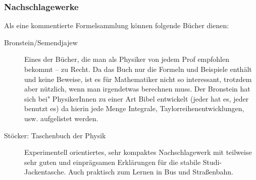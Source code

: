 \subsubsection*{Nachschlagewerke}

Als eine kommentierte Formelsammlung können folgende Bücher dienen:

\begin{description}

\item[Bronstein/Semendjajew]{
Eines der Bücher, die man als Physiker von jedem Prof empfohlen
bekommt -- zu
Recht. Da das Buch nur die Formeln und Beispiele enthält und keine
Beweise,
ist es für Mathematiker nicht so interessant, trotzdem aber nützlich,
wenn
man irgendetwas berechnen muss. Der Bronstein hat sich bei"
PhysikerInnen
zu einer Art Bibel entwickelt (jeder hat es, jeder benutzt es) da
hierin jede Menge Integrale,
Taylorreihenentwicklungen, usw. aufgelistet werden.}

\item[Stöcker: Taschenbuch der Physik]{
Experimentell orientiertes, sehr kompaktes Nachschlagewerk mit
teilweise sehr
guten und einprägsamen Erklärungen für die stabile Studi-
Jackentasche.
Auch praktisch zum Lernen in Bus und Straßenbahn.}
\end{description}
